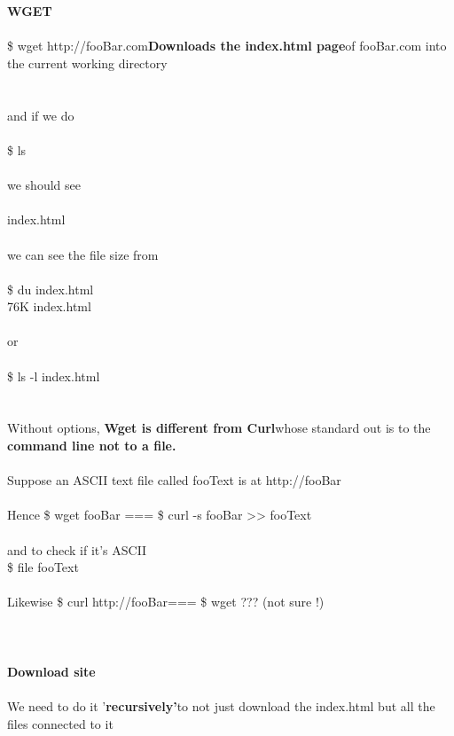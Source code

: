 \documentclass[10pt,a4paper]{article}
\begin{document}
\textbf{{\Large \\
\\
WGET\\
}}{\large \\
\$ wget http://fooBar.com}{\large \textbf{Downloads the index.html page}}{\large  of fooBar.com into the current working directory\\
\\
\\
	and if we do\\
\\
	\$ ls \\
\\
	we should see \\
\\
	index.html\\
\\
	we can see the file size from\\
\\
	\$ du index.html\\
	76K   index.html\\
\\
	or \\
\\
	\$ ls -l index.html\\
\\
\\
Without options, \textbf{Wget is different from Curl}}{\large  whose standard out is to the \textbf{command line not to a file.}}{\large \\
\\
Suppose an ASCII text file called fooText is at http://fooBar}{\large \\
\\
Hence   	\$ wget fooBar === \$ curl -s fooBar >> fooText\\
\\
		and to check if it's ASCII  \\
		\$ file fooText 		\\
		\\
Likewise 	\$ curl http://fooBar}{\large  === \$ wget  ??? (not sure !)\\
\\
\\
\\
\textbf{Download site}}{\large \\
\\
We need to do it '\textbf{recursively'}}{\large  to not just download the index.html but all the files connected to it\\
\\
}
\end{document}
